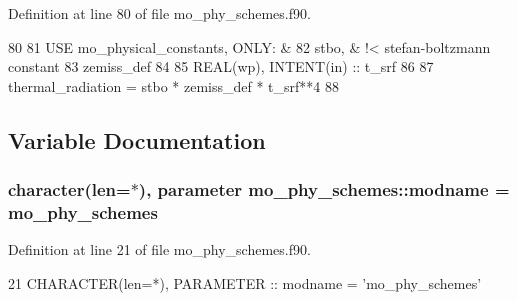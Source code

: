 Definition at line 80 of file mo\+\_\+phy\+\_\+schemes.\+f90.


\begin{DoxyCode}
80 
81     \textcolor{keywordtype}{USE }mo\_physical\_constants\textcolor{keywordtype}{, ONLY}: &
82       stbo,       &  !< stefan-boltzmann constant
83       zemiss\_def     
84 
85     \textcolor{keywordtype}{REAL(wp)}, \textcolor{keywordtype}{INTENT(in)} :: t\_srf
86 
87     thermal\_radiation = stbo * zemiss\_def * t\_srf**4
88 
\end{DoxyCode}


\subsection{Variable Documentation}
\hypertarget{namespacemo__phy__schemes_a1bb1f1820a2d3f1246c68c21ab241ce6}{}
\subsubsection[{modname}]{\setlength{\rightskip}{0pt plus 5cm}character(len=$\ast$), parameter mo\+\_\+phy\+\_\+schemes\+::modname = \textquotesingle{}mo\+\_\+phy\+\_\+schemes\textquotesingle{}}\label{namespacemo__phy__schemes_a1bb1f1820a2d3f1246c68c21ab241ce6}


Definition at line 21 of file mo\+\_\+phy\+\_\+schemes.\+f90.


\begin{DoxyCode}
21   \textcolor{keywordtype}{CHARACTER(len=*)}, \textcolor{keywordtype}{PARAMETER} :: modname = \textcolor{stringliteral}{'mo\_phy\_schemes'}
\end{DoxyCode}
